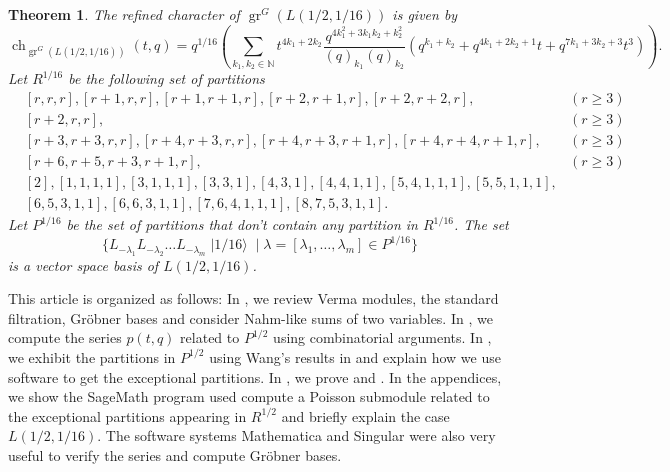 \documentclass[a4paper, 12pt, reqno]{amsart}
\newtheorem{theorem}{Theorem}[section]
\theoremstyle{remark}
\DeclareMathOperator{\gr}{gr}
\DeclareMathOperator{\ch}{ch}
\DeclareMathOperator{\vacsixteen}{|1/16\rangle}
\begin{document}
\begin{theorem}
  \label{thr:5}
  The refined character of $\gr^G(L(1/2, 1/16))$ is given by
  \begin{equation*}
    \ch_{\gr^G(L(1/2, 1/16))}(t, q) = q^{1/16}\left(\sum_{k_1, k_2 \in \mathbb{N}}t^{4k_1 + 2k_2}\frac{q^{4k_1^2 + 3k_1k_2 + k_2^2}}{(q)_{k_1}(q)_{k_2}}(q^{k_1 + k_2} + q^{4k_1 + 2k_2 + 1}t + q^{7k_1 + 3k_2 + 3}t^3)\right).
  \end{equation*}
  Let $R^{1/16}$ be the following set of partitions
  \begin{align*}
    &[r, r, r], [r + 1, r, r], [r + 1, r + 1, r], [r + 2, r + 1, r], [r + 2, r + 2, r], &(r \ge 3) \\
    &[r + 2, r, r], &(r \ge 3) \\
    &[r + 3, r + 3, r, r], [r + 4, r + 3, r, r],  [r + 4, r + 3, r + 1, r], [r + 4, r + 4, r + 1, r], &(r \ge 3)\\
    &[r + 6, r + 5, r + 3, r + 1, r], &(r \ge 3) \\
    &[2], [1, 1, 1, 1], [3, 1, 1, 1], [3, 3, 1], [4, 3, 1], [4, 4, 1, 1], [5, 4, 1, 1, 1], [5, 5, 1, 1, 1], \\
    &[6, 5, 3, 1, 1], [6, 6, 3, 1, 1], [7, 6, 4, 1, 1, 1], [8, 7, 5, 3, 1, 1].
  \end{align*}
  Let $P^{1/16}$ be the set of partitions that don't contain any partition in $R^{1/16}$.
  The set
  \begin{equation*}
    \{L_{-\lambda_1}L_{-\lambda_2}\dots L_{-\lambda_m}\vacsixteen \mid \lambda = [\lambda_1, \dots, \lambda_m] \in P^{1/16}\}
  \end{equation*}
  is a vector space basis of $L(1/2, 1/16)$.
\end{theorem}

This article is organized as follows: In , we review Verma modules, the standard filtration, Gr\"{o}bner bases and consider Nahm-like sums of two variables.
In , we compute the series $p(t, q)$ related to $P^{1/2}$ using combinatorial arguments.
In , we exhibit the partitions in $P^{1/2}$ using Wang's results in \cite{wang_rationality_1993} and explain how we use software to get the exceptional partitions.
In , we prove  and .
In the appendices, we show the SageMath \cite{sagemath} program used compute a Poisson submodule related to the exceptional partitions appearing in $R^{1/2}$ and briefly explain the case $L(1/2, 1/16)$.
The software systems Mathematica \cite{Mathematica} and Singular \cite{Singular} were also very useful to verify the series and compute Gr\"{o}bner bases.
\end{document}
